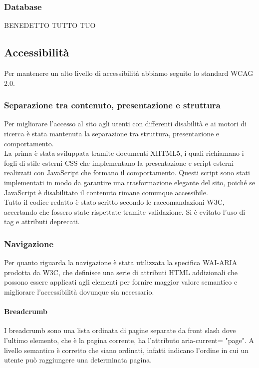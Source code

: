 \subsubsection{Database}
BENEDETTO TUTTO TUO

\subsection{Accessibilità}
Per mantenere un alto livello di accessibilità abbiamo seguito lo standard WCAG 2.0.

\subsubsection{Separazione tra contenuto, presentazione e struttura}
Per migliorare l’accesso al sito agli utenti con differenti disabilità e ai motori di ricerca è stata mantenuta la separazione tra struttura, presentazione e comportamento.\\
La prima è stata sviluppata tramite documenti XHTML5, i quali richiamano i fogli di stile esterni CSS che implementano la presentazione e script esterni realizzati con JavaScript che formano il comportamento. Questi script sono stati implementati in modo da garantire una trasformazione elegante del sito, poiché se JavaScript è disabilitato il contenuto rimane comunque accessibile.\\
Tutto il codice redatto è stato scritto secondo le raccomandazioni W3C, accertando che fossero state rispettate tramite validazione. Si è evitato l’uso di tag e attributi deprecati.

\subsubsection{Navigazione} \label{subsection:navigazione}
Per quanto riguarda la navigazione è stata utilizzata la specifica WAI-ARIA prodotta da W3C, che definisce una serie di attributi HTML addizionali che possono essere applicati agli elementi per fornire maggior valore semantico e migliorare l'accessibilità dovunque sia necessario.

\paragraph{Breadcrumb} I breadcrumb sono una lista ordinata di pagine separate da front slash dove l'ultimo elemento, che è la pagina corrente, ha l'attributo aria-current= "page". A livello semantico è corretto che siano ordinati, infatti indicano l'ordine in cui un utente può raggiungere una determinata pagina.

